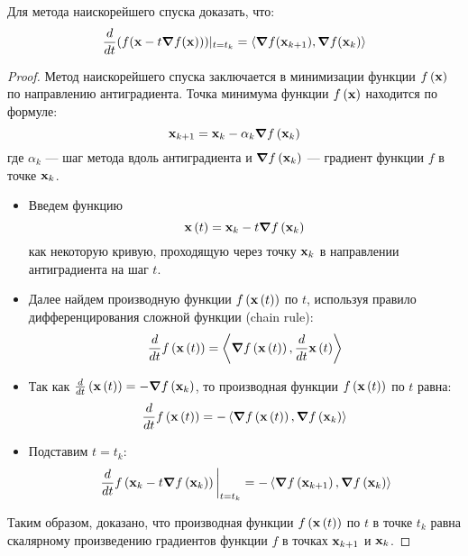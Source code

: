 \begin{problem}
Для метода наискорейшего спуска доказать, что:
\[
    \dv{t}(f(\vb{x} - t \grad{f(\vb{x})}))|_{t=t_k}
    = \left\langle \grad{f(\vb{x}_{k+1})} , \grad{f(\vb{x}_k)} \right\rangle
\]
\end{problem}

\begin{proof}

    Метод наискорейшего спуска заключается в минимизации функции $f\left(\vb{x}\right)$ по направлению антиградиента. Точка минимума функции $f\left(\vb{x}\right)$ находится по формуле:
    \[
        \vb{x}_{k+1} = \vb{x}_k - \alpha_k \grad{f\left(\vb{x}_k\right)}
    \]
    где $\alpha_k$ — шаг метода вдоль антиградиента и $\grad{f\left(\vb{x}_k\right)}$ — градиент функции $f$ в точке $\vb{x}_k$.

    \begin{itemize}
        \item Введем функцию
              \[
                  \vb{x}\left(t\right) = \vb{x}_k - t \grad{f\left(\vb{x}_k\right)}
              \]
              как некоторую кривую, проходящую через точку $\vb{x}_k$
              в направлении антиградиента на шаг $t$.
        \item Далее найдем производную функции $f\left(\vb{x}\left(t\right)\right)$ по $t$, используя правило дифференцирования сложной функции (chain rule):
              \[
                  \dv{t} f\left(\vb{x}\left(t\right)\right) = \left\langle \grad{f\left(\vb{x}\left(t\right)\right)}, \dv{t} \vb{x}\left(t\right) \right\rangle
              \]
        \item Так как $\dv{t}\left(\vb{x}\left(t\right)\right) = -\grad{f \left(\vb{x}_k\right)}$,
              то производная функции $f\left(\vb{x}\left(t\right)\right)$ по $t$ равна:
              \[
                  \dv{t} f\left(\vb{x}\left(t\right)\right) = -\left\langle \grad{f\left(\vb{x}\left(t\right)\right)}, \grad{f\left(\vb{x}_k\right)} \right\rangle
              \]
        \item Подставим $t= t_k$:
              \[
                  \eval{\dv{t} f\left(\vb{x}_k - t \grad{f\left(\vb{x}_k\right)}\right)}_{t=t_k}
                  = -\dprod{\grad{f\left(\vb{x}_{k+1}\right)}}{\grad{f\left(\vb{x}_k\right)}}
              \]

    \end{itemize}
    Таким образом, доказано, что производная функции $f\left(\vb{x}\left(t\right)\right)$ по $t$ в точке $t_k$ равна скалярному произведению градиентов функции $f$ в точках $\vb{x}_{k+1}$ и $\vb{x}_k$.
\end{proof}

